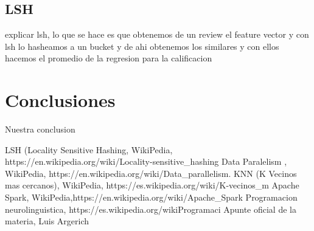\documentclass[a4paper,10pt]{article}
\begin{document}
	
	\subsection{LSH}
	
	explicar lsh, lo que se hace es que obtenemos de un review el feature vector y con lsh lo hasheamos a un bucket y de ahi obtenemos los similares y con ellos hacemos el promedio de la regresion para la calificacion
	
	\section{Conclusiones}
	
	Nuestra conclusion
	
	\begin{thebibliography}{99}
		 LSH (Locality Sensitive Hashing, WikiPedia, https://en.wikipedia.org/wiki/Locality-sensitive_hashing
		 Data Paralelism , WikiPedia, https://en.wikipedia.org/wiki/Data_parallelism.
		 KNN (K Vecinos mas cercanos), WikiPedia, https://es.wikipedia.org/wiki/K-vecinos_m%
		 Apache Spark, WikiPedia,https://en.wikipedia.org/wiki/Apache_Spark
		 Programacion neurolinguistica, https://es.wikipedia.org/wikiProgramaci%
		 Apunte oficial de la materia, Luis Argerich

	\end{thebibliography}
	
\end{document}
